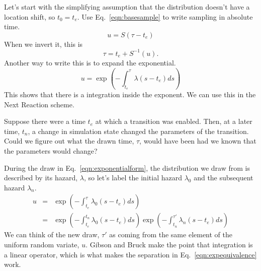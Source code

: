 \documentclass{article}
\begin{document}
Let's start with the simplifying assumption that the distribution doesn't have a location shift, so $t_0=t_e$. Use Eq.~\ref{eqn:basesample} to write sampling in absolute time.
\begin{equation}
	u = S(\tau - t_e)
\end{equation}
When we invert it, this is
\begin{equation}
	\tau = t_e + S^{-1}(u).
\end{equation}
Another way to write this is to expand the exponential.
\begin{equation}
u=\exp\left(-\int_{t_e}^{\tau}\lambda(s-t_e)ds\right)\label{eqn:exponentialform}
\end{equation}
This shows that there is a integration inside the exponent. We can use this in the Next Reaction scheme.

Suppose there were a time $t_e$ at which a transition was enabled. Then, at a later time, $t_n$, a change in simulation state changed the parameters of the transition. Could we figure out what the drawn time, $\tau$, would have been had we known that the parameters would change?

During the draw in Eq.~\ref{eqn:exponentialform}, the distribution we draw from is described by its hazard, $\lambda$, so let's label the initial hazard $\lambda_0$ and the subsequent hazard $\lambda_n$.
\begin{eqnarray}
	u&=&\exp\left(-\int_{t_e}^{\tau}\lambda_0(s-t_e)ds\right) \\
	&=& \exp\left(-\int_{t_e}^{t_n}\lambda_0(s-t_e)ds\right)\exp\left(-\int_{t_n}^{\tau'}\lambda_{n}(s-t_e)ds\right)\label{eqn:expequivalence}
\end{eqnarray}
We can think of the new draw, $\tau'$ as coming from the same element of the uniform random variate, $u$. Gibson and Bruck make the point that integration is a linear operator, which is what makes the separation in Eq.~\ref{eqn:expequivalence} work.
\end{document}
